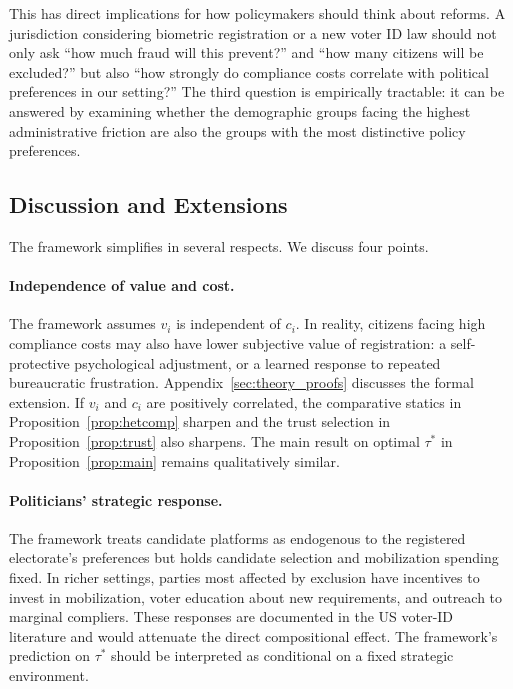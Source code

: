 This has direct implications for how policymakers should think about reforms. A jurisdiction considering biometric registration or a new voter ID law should not only ask ``how much fraud will this prevent?'' and ``how many citizens will be excluded?'' but also ``how strongly do compliance costs correlate with political preferences in our setting?'' The third question is empirically tractable: it can be answered by examining whether the demographic groups facing the highest administrative friction are also the groups with the most distinctive policy preferences.

\subsection{Discussion and Extensions}
\label{ssec:discussion}

The framework simplifies in several respects. We discuss four points.

\paragraph{Independence of value and cost.} The framework assumes $v_i$ is independent of $c_i$. In reality, citizens facing high compliance costs may also have lower subjective value of registration: a self-protective psychological adjustment, or a learned response to repeated bureaucratic frustration. Appendix~\ref{sec:theory_proofs} discusses the formal extension. If $v_i$ and $c_i$ are positively correlated, the comparative statics in Proposition~\ref{prop:hetcomp} sharpen and the trust selection in Proposition~\ref{prop:trust} also sharpens. The main result on optimal $\tau^*$ in Proposition~\ref{prop:main} remains qualitatively similar.

\paragraph{Politicians' strategic response.} The framework treats candidate platforms as endogenous to the registered electorate's preferences but holds candidate selection and mobilization spending fixed. In richer settings, parties most affected by exclusion have incentives to invest in mobilization, voter education about new requirements, and outreach to marginal compliers. These responses are documented in the US voter-ID literature \citep{Hopkins2017, Grimmer2021TheDurableDifferen} and would attenuate the direct compositional effect. The framework's prediction on $\tau^*$ should be interpreted as conditional on a fixed strategic environment.

